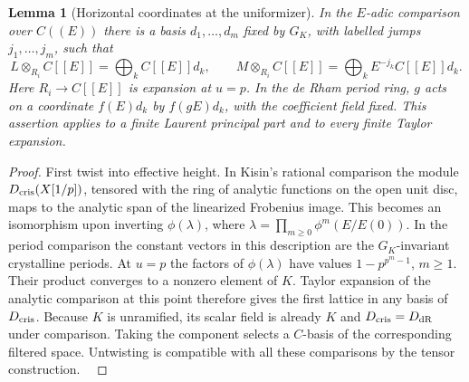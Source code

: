 \documentclass[a4paper,11pt]{article}
\newtheorem{lemma}[proposition]{Lemma}
\theoremstyle{definition}
\theoremstyle{remark}
\numberwithin{equation}{section}
\begin{document}
\begin{lemma}[Horizontal coordinates at the uniformizer]
\leavevmode\label{lem:horizontalcoordinates767}
In the \(E\)-adic comparison over \(C((E))\) there is a
basis \(d_1,\ldots,d_m\) fixed by \(G_K\), with labelled
jumps \(j_1,\ldots,j_m\), such that
\[
    L\otimes_{R_i}C[[E]]=\bigoplus_k C[[E]]d_k,\qquad
    M\otimes_{R_i}C[[E]]=\bigoplus_k E^{-j_k}C[[E]]d_k.
\]
Here \(R_i\to C[[E]]\) is expansion at \(u=p\).
In the de Rham period ring, \(g\) acts on a coordinate
\(f(E)d_k\) by \(f(gE)d_k\), with the coefficient field
fixed. This assertion applies to a finite Laurent principal
part and to every finite Taylor expansion.
\end{lemma}
\begin{proof}
First twist into effective height. In Kisin's rational
comparison the module \(D_{\rm cris}(X[1/p])\), tensored
with the ring of analytic functions on the open unit disc,
maps to the analytic span of the linearized Frobenius image.
This becomes an isomorphism upon inverting \(\phi(\lambda)\),
where \(\lambda=\prod_{m\ge0}\phi^m(E/E(0))\). In the period
comparison the constant vectors in this description are
the \(G_K\)-invariant crystalline periods. At \(u=p\) the
factors of \(\phi(\lambda)\) have values
\(1-p^{p^m-1}\), \(m\ge1\). Their product converges to a
nonzero element of \(K\). Taylor expansion of the analytic
comparison at this point therefore gives the first lattice
in any basis of \(D_{\rm cris}\). Because \(K\) is unramified,
its scalar field is already \(K\) and
\(D_{\rm cris}=D_{\rm dR}\) under comparison. Taking the
component selects a \(C\)-basis of the corresponding
filtered space. Untwisting is compatible with all these
comparisons by the tensor construction.
~\cite[Lemma~2.1.8, (2.1.9), and Proposition~2.1.10]{III-II-bartlettcrys767}


\end{proof}
\end{document}
